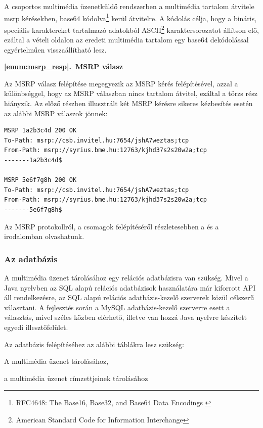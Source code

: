 A csoportos multimédia üzenetküldő rendszerben a multimédia tartalom átvitele msrp kérésekben, base64 kódolva\footnote{RFC4648: The Base16, Base32, and Base64 Data Encodings \cite{rfc4648}} kerül átvitelre. A kódolás célja, hogy a bináris, speciális karaktereket tartalmazó adatokból ASCII\footnote{American Standard Code for Information Interchange} karaktersorozatot állítson elő, ezáltal a vételi oldalon az eredeti multimédia tartalom egy base64 dekódolással egyértelműen visszaállítható lesz.
\bigskip

\noindent
{\bf \ref{enum:msrp_resp}.~MSRP válasz}

Az MSRP válasz felépítése megegyezik az MSRP kérés felépítésével, azzal a különbséggel, hogy az MSRP válaszban nincs tartalom átvitel, ezáltal a törzs rész hiányzik. Az előző részben illusztrált két MSRP kérésre sikeres kézbesítés esetén az alábbi MSRP válaszok jönnek:
\fontsize{10}{10}
\begin{verbatim}
MSRP 1a2b3c4d 200 OK
To-Path: msrp://csb.invitel.hu:7654/jshA7weztas;tcp
From-Path: msrp://syrius.bme.hu:12763/kjhd37s2s20w2a;tcp
-------1a2b3c4d$

MSRP 5e6f7g8h 200 OK
To-Path: msrp://csb.invitel.hu:7654/jshA7weztas;tcp
From-Path: msrp://syrius.bme.hu:12763/kjhd37s2s20w2a;tcp
-------5e6f7g8h$
\end{verbatim}
\fontsize{12}{12} 

\bigskip

Az MSRP protokollról, a csomagok felépítéséről részletesebben a \cite{rfc4975} és a \cite{rfc4976} irodalomban olvashatunk.

\subsubsection{Az adatbázis}
\label{sec:adatb}

A multimédia üzenet tárolásához egy relációs adatbázisra van szükség. Mivel a Java nyelvben az SQL alapú relációs adatbázisok használatára már kiforrott API áll rendelkezésre, az SQL alapú relációs adatbázis-kezelő szerverek közül célszerű választani. A fejlesztés során a MySQL adatbázis-kezelő szerverre esett a választás, mivel széles közben elérhető, illetve van hozzá Java nyelvre készített egyedi illesztőfelület.

Az adatbázis felépítéséhez az alábbi táblákra lesz szükség:

\begin{myitemize}
\item A multimédia üzenet tárolásához,
\item a multimédia üzenet címzettjeinek tárolásához
\end{myitemize}

